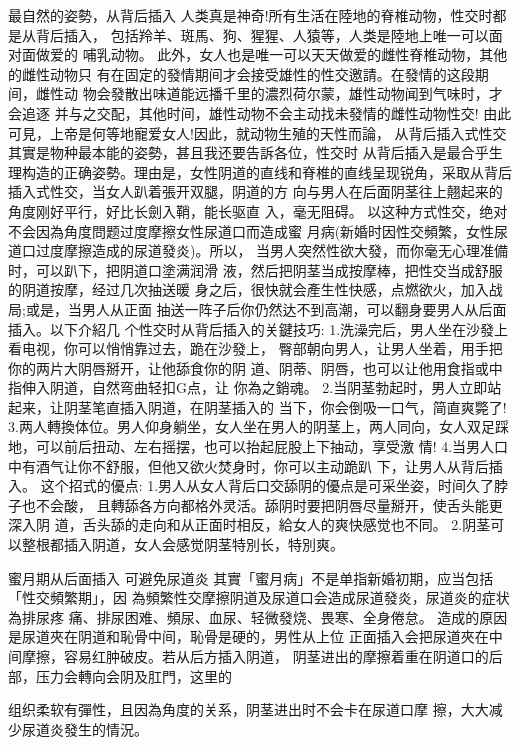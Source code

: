 \documentclass[12pt,UTF8]{ctexbook}
\begin{document}
最自然的姿勢，从背后插入
人类真是神奇!所有生活在陸地的脊椎动物，性交时都是从背后插入，
包括羚羊、斑馬、狗、猩猩、人猿等，人类是陸地上唯一可以面对面做爱的
哺乳动物。
此外，女人也是唯一可以天天做爱的雌性脊椎动物，其他的雌性动物只
有在固定的發情期间才会接受雄性的性交邀請。在發情的这段期间，雌性动
物会發散出味道能远播千里的濃烈荷尔蒙，雄性动物闻到气味时，才会追逐
并与之交配，其他时间，雄性动物不会主动找未發情的雌性动物性交!
由此可見，上帝是何等地寵爱女人!因此，就动物生殖的天性而論，
从背后插入式性交其實是物种最本能的姿勢，甚且我还要告訴各位，性交时
从背后插入是最合乎生理构造的正确姿勢。理由是，女性阴道的直线和脊椎的直线呈现锐角，采取从背后插入式性交，当女人趴着張开双腿，阴道的方
向与男人在后面阴茎往上翹起来的角度刚好平行，好比长劍入鞘，能长驱直
入，毫无阻碍。
以这种方式性交，绝对不会因為角度問题过度摩擦女性尿道口而造成蜜
月病(新婚时因性交頻繁，女性尿道口过度摩擦造成的尿道發炎)。所以，
当男人突然性欲大發，而你毫无心理准備时，可以趴下，把阴道口塗满润滑
液，然后把阴茎当成按摩棒，把性交当成舒服的阴道按摩，经过几次抽送暖
身之后，很快就会產生性快感，点燃欲火，加入战局;或是，当男人从正面
抽送一阵子后你仍然达不到高潮，可以翻身要男人从后面插入。以下介紹几
个性交时从背后插入的关鍵技巧:
1.洗澡完后，男人坐在沙發上看电视，你可以悄悄靠过去，跪在沙發上，
臀部朝向男人，让男人坐着，用手把你的两片大阴唇掰开，让他舔食你的阴
道、阴蒂、阴唇，也可以让他用食指或中指伸入阴道，自然弯曲轻扣G点，让
你為之銷魂。
2.当阴茎勃起时，男人立即站起来，让阴茎笔直插入阴道，在阴茎插入的
当下，你会倒吸一口气，简直爽斃了!
3.两人轉換体位。男人仰身躺坐，女人坐在男人的阴茎上，两人同向，女人双足踩地，可以前后扭动、左右摇摆，也可以抬起屁股上下抽动，享受激
情!
4.当男人口中有酒气让你不舒服，但他又欲火焚身时，你可以主动跪趴
下，让男人从背后插入。
这个招式的優点:
1.男人从女人背后口交舔阴的優点是可采坐姿，时间久了脖子也不会酸，
且轉舔各方向都格外灵活。舔阴时要把阴唇尽量掰开，使舌头能更深入阴
道，舌头舔的走向和从正面时相反，給女人的爽快感觉也不同。
2.阴茎可以整根都插入阴道，女人会感觉阴茎特別长，特別爽。

蜜月期从后面插入
可避免尿道炎
其實「蜜月病」不是单指新婚初期，应当包括「性交頻繁期」，因
為頻繁性交摩擦阴道及尿道口会造成尿道發炎，尿道炎的症状為排尿疼
痛、排尿困难、頻尿、血尿、轻微發烧、畏寒、全身倦怠。
造成的原因是尿道夾在阴道和恥骨中间，恥骨是硬的，男性从上位
正面插入会把尿道夾在中间摩擦，容易红肿破皮。若从后方插入阴道，
阴茎进出的摩擦着重在阴道口的后部，压力会轉向会阴及肛門，这里的

组织柔软有彈性，且因為角度的关系，阴茎进出时不会卡在尿道口摩
擦，大大减少尿道炎發生的情況。
\end{document}
